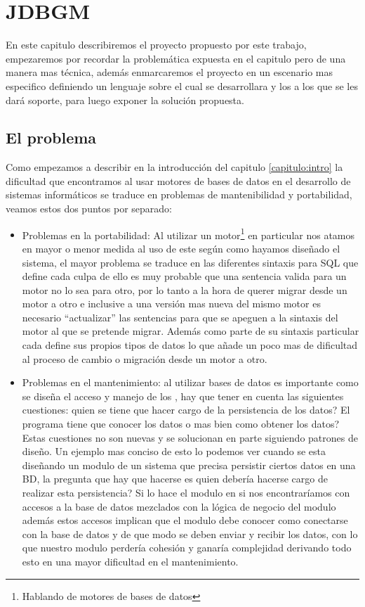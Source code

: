 \chapter{JDBGM}
En este capitulo describiremos el proyecto propuesto por este trabajo, empezaremos por recordar la problemática expuesta en el capitulo  pero de una manera mas técnica, además enmarcaremos el proyecto en un escenario mas especifico definiendo un lenguaje sobre el cual se desarrollara y los \dd a los que se les dará soporte, para luego exponer la solución propuesta.

\section{El problema}
Como empezamos a describir en la introducción del capitulo \ref{capitulo:intro} la dificultad que encontramos al usar motores de bases de datos en el desarrollo de sistemas informáticos se traduce en problemas de mantenibilidad y portabilidad, veamos estos dos puntos por separado:
\begin{itemize}
\item Problemas en la portabilidad: Al utilizar un motor\footnote{Hablando de motores de bases de datos} en particular nos atamos en mayor o menor medida al uso de este según como hayamos diseñado el sistema, el mayor problema se traduce en las diferentes sintaxis para SQL que define cada \dd culpa de ello es muy probable que una sentencia valida para un motor no lo sea para otro, por lo tanto a la hora de querer migrar desde un motor a otro e inclusive a una versión mas nueva del mismo motor es necesario  ``actualizar'' las sentencias para que se apeguen a la sintaxis del motor al que se pretende migrar. Además como parte de su sintaxis particular cada \dd define sus propios tipos de datos lo que añade un poco mas de dificultad al proceso de cambio o migración desde un motor a otro.  
\item  Problemas en el mantenimiento: al utilizar bases de datos es importante como se diseña el acceso y manejo de los \dd, hay que tener en cuenta las siguientes cuestiones: quien se tiene que hacer cargo de la persistencia de los datos? El programa tiene que conocer los datos o mas bien como obtener los datos? Estas cuestiones no son nuevas y se solucionan en parte siguiendo patrones de diseño. Un ejemplo mas conciso de esto lo podemos ver cuando se esta diseñando un modulo de un sistema que precisa persistir ciertos datos en una BD, la pregunta que hay que hacerse es quien debería hacerse cargo de realizar esta persistencia? Si lo hace el modulo en si nos encontraríamos con accesos a la base de datos mezclados con la lógica de negocio del modulo además estos accesos implican que el modulo debe conocer como conectarse con la base de datos y de que modo se deben enviar y recibir los datos, con lo que nuestro modulo	perdería cohesión y ganaría complejidad derivando todo esto en una mayor dificultad en el mantenimiento.
\end{itemize}
